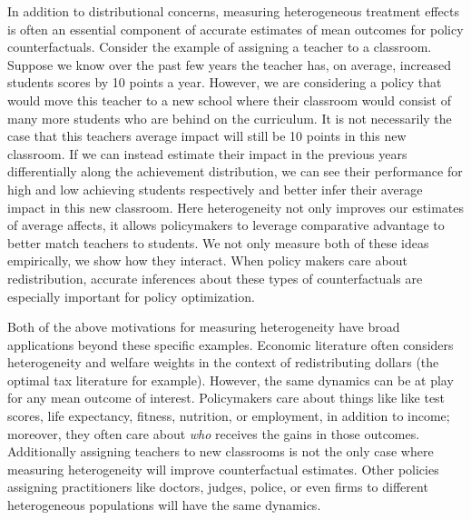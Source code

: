 \documentclass[12pt]{article}
\theoremstyle{definition}
\theoremstyle{definition}
\theoremstyle{definition}
\theoremstyle{definition}
\begin{document}
    In addition to distributional concerns, measuring heterogeneous treatment effects is often an essential component of accurate estimates of mean outcomes for policy counterfactuals. Consider the example of assigning a teacher to a classroom. Suppose we know over the past few years the teacher has, on average, increased students scores by 10 points a year. However, we are considering a policy that would move this teacher to a new school where their classroom would consist of many more students who are behind on the curriculum. It is not necessarily the case that this teachers average impact will still be 10 points in this new classroom. If we can instead estimate their impact in the previous years differentially along the achievement distribution, we can see their performance for high and low achieving students respectively and better infer their average impact in this new classroom. Here heterogeneity not only improves our estimates of average affects, it allows policymakers to leverage comparative advantage to better match teachers to students. We not only measure both of these ideas empirically, we show how they interact. When policy makers care about redistribution, accurate inferences about these types of counterfactuals are especially important for policy optimization.  

    Both of the above motivations for measuring heterogeneity have broad applications beyond these specific examples. Economic literature often considers heterogeneity and welfare weights in the context of redistributing dollars (the optimal tax literature for example). However, the same dynamics can be at play for any mean outcome of interest. Policymakers care about things like like test scores, life expectancy, fitness, nutrition, or employment, in addition to income; moreover, they often care about \emph{who} receives the gains in those outcomes. Additionally assigning teachers to new classrooms is not the only case where measuring heterogeneity will improve counterfactual estimates. Other policies assigning practitioners like doctors, judges, police, or even firms to different heterogeneous populations will have the same dynamics.
    
    
    
\end{document}
